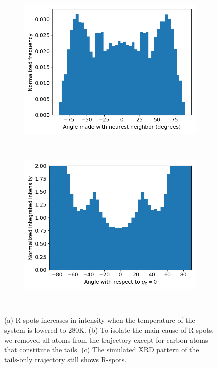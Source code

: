 \documentclass[journal=jpcbfk,manuscript=article]{achemso}
\begin{document}
\begin{figure}[!htb]
\begin{subfigure}[t]{0.32\linewidth}
	        \includegraphics[width=\linewidth]{angles_traj_layered.png}
	        \caption{}~\label{fig:layered_tails}
  \end{subfigure}
  \begin{subfigure}[t]{0.32\textwidth}
        	\centering
	        \includegraphics[width=\linewidth]{layered_angle_v_I.png}
	        \caption{}~\label{fig:layered_integration}
  \end{subfigure}
  \caption{(a) R-spots increases in intensity when the temperature of the system is 
      lowered to 280K. (b) To isolate the main cause of R-spots, we removed all atoms
      from the trajectory except for carbon atoms that constitute the tails. (c) The
      simulated XRD pattern of the tails-only trajectory still shows R-spots. 
}
\end{figure}
\end{document}
